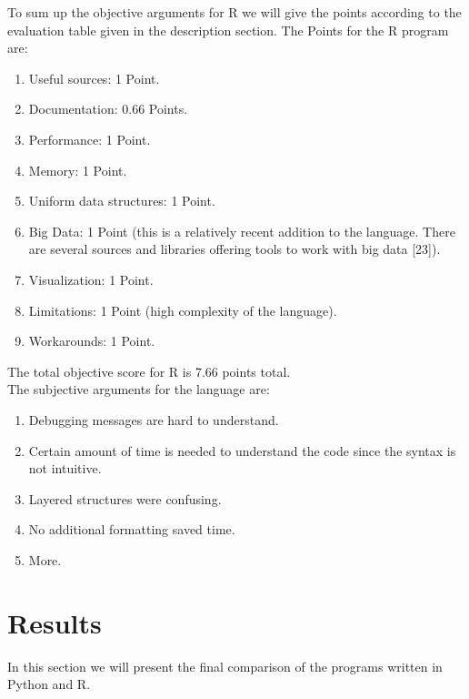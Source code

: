 \documentclass[
  twoside,
  12pt, a4paper,
  footinclude=true,
  headinclude=true,
  cleardoublepage=empty
]{article}
\begin{document}
To sum up the objective arguments for R we will give the points according to the evaluation table given in the description section. The Points for the R program are:
\begin{enumerate}
    \item Useful sources: 1 Point.
    \item Documentation: 0.66 Points.
    \item Performance: 1 Point.
    \item Memory: 1 Point.
    \item Uniform data structures: 1 Point.
    \item Big Data: 1 Point (this is a relatively recent addition to the language. There are several sources and libraries offering tools to work with big data [23]).
    \item Visualization: 1 Point.
    \item Limitations: 1 Point (high complexity of the language).
    \item Workarounds: 1 Point.
\end{enumerate} 
The total objective score for R is 7.66 points total.\\
The subjective arguments for the language are:
\begin{enumerate}
    \item Debugging messages are hard to understand.
    \item Certain amount of time is needed to understand the code since the syntax is not intuitive.
    \item Layered structures were confusing.
    \item No additional formatting saved time.
    \item More.
\end{enumerate}

\newpage
\section{Results}
In this section we will present the final comparison of the programs written in Python and R.
\end{document}
